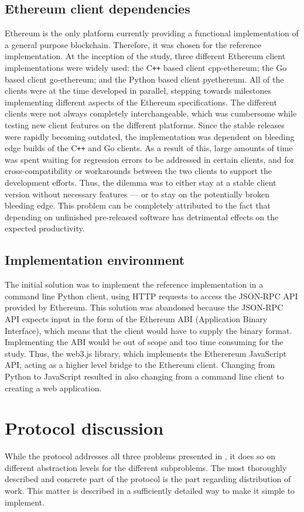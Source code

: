 \subsection{Ethereum client dependencies}
Ethereum is the only platform currently providing a functional implementation of a general purpose blockchain. Therefore, it was chosen  for the reference implementation. At the inception of the study, three different Ethereum client implementations were widely used: the C\texttt{++} based client cpp-ethereum; the Go based client go-ethereum; and the Python based client pyethereum. All of the clients were at the time developed in parallel, stepping towards milestones implementing different aspects of the Ethereum specifications. The different clients were not always completely interchangeable, which was cumbersome while testing new client features on the different platforms. Since the stable releases were rapidly becoming outdated, the implementation was dependent on bleeding edge builds of the C\texttt{++} and Go clients. As a result of this, large amounts of time was spent waiting for regression errors to be addressed in certain clients, and for cross-compatibility or workarounds between the two clients to support the development efforts. Thus, the dilemma was to either stay at a stable client version without necessary features --- or to stay on the potentially broken bleeding edge. This problem can be completely attributed to the fact that depending on unfinished pre-released software has detrimental effects on the expected productivity.

\subsection{Implementation environment}
The initial solution was to implement the reference implementation in a command line Python client, using HTTP requests to access the JSON-RPC API provided by Ethereum. This solution was abandoned because the JSON-RPC API expects input in the form of the Ethereum ABI (Application Binary Interface), which means that the client would have to supply the binary format. Implementing the ABI would be out of scope and too time consuming for the study. Thus, the web3.js library, which implements the Etherereum JavaScript API, acting as a higher level bridge to the Ethereum client. Changing from Python to JavaScript resulted in also changing from a command line client to creating a web application.

\section{Protocol discussion}
While the protocol addresses all three problems presented in , it does so on different abstraction levels for the different subproblems. The most thoroughly described and concrete part of the protocol is the part regarding distribution of work. This matter is described in a sufficiently detailed way to make it simple to implement.


